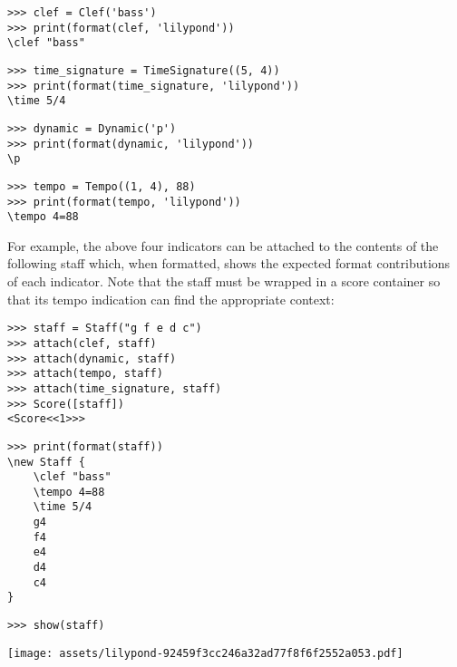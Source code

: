 \begin{comment}
<abjad>
clef = Clef('bass')
print(format(clef, 'lilypond'))
time_signature = TimeSignature((5, 4))
print(format(time_signature, 'lilypond'))
dynamic = Dynamic('p')
print(format(dynamic, 'lilypond'))
tempo = Tempo((1, 4), 88)
print(format(tempo, 'lilypond'))
</abjad>
\end{comment}

\begin{abjadbookoutput}
\begin{singlespacing}
\vspace{-0.5\baselineskip}
\begin{verbatim}
>>> clef = Clef('bass')
>>> print(format(clef, 'lilypond'))
\clef "bass"
\end{verbatim}
\begin{verbatim}
>>> time_signature = TimeSignature((5, 4))
>>> print(format(time_signature, 'lilypond'))
\time 5/4
\end{verbatim}
\begin{verbatim}
>>> dynamic = Dynamic('p')
>>> print(format(dynamic, 'lilypond'))
\p
\end{verbatim}
\begin{verbatim}
>>> tempo = Tempo((1, 4), 88)
>>> print(format(tempo, 'lilypond'))
\tempo 4=88
\end{verbatim}
\end{singlespacing}
\end{abjadbookoutput}

\noindent For example, the above four indicators can be attached to the
contents of the following staff which, when formatted, shows the expected
format contributions of each indicator. Note that the staff must be wrapped in
a score container so that its tempo indication can find the appropriate
context:

\begin{comment}
<abjad>
staff = Staff("g f e d c")
attach(clef, staff)
attach(dynamic, staff)
attach(tempo, staff)
attach(time_signature, staff)
Score([staff])
print(format(staff))
show(staff)
</abjad>
\end{comment}

\begin{abjadbookoutput}
\begin{singlespacing}
\vspace{-0.5\baselineskip}
\begin{verbatim}
>>> staff = Staff("g f e d c")
>>> attach(clef, staff)
>>> attach(dynamic, staff)
>>> attach(tempo, staff)
>>> attach(time_signature, staff)
>>> Score([staff])
<Score<<1>>>
\end{verbatim}
\begin{verbatim}
>>> print(format(staff))
\new Staff {
    \clef "bass"
    \tempo 4=88
    \time 5/4
    g4
    f4
    e4
    d4
    c4
}
\end{verbatim}
\begin{verbatim}
>>> show(staff)
\end{verbatim}
\noindent\texttt{[image: assets/lilypond-92459f3cc246a32ad77f8f6f2552a053.pdf]}
\end{singlespacing}
\end{abjadbookoutput}

